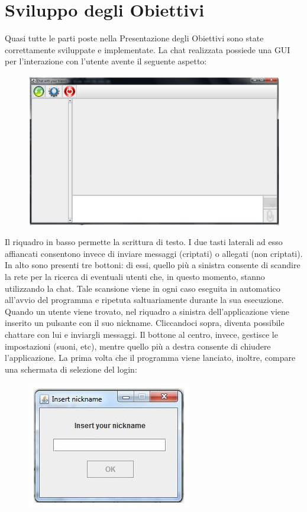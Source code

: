 \section{Sviluppo degli Obiettivi}
Quasi tutte le parti poste nella Presentazione degli Obiettivi sono state correttamente
sviluppate e implementate. La chat realizzata possiede una GUI per l'interazione
con l'utente avente il seguente aspetto:
\newpage
\begin{figure}[h]
\centering
\includegraphics[scale=0.4]{gui1.jpg}
\end{figure}

Il riquadro in basso permette la scrittura di testo.
I due tasti laterali ad esso affiancati
consentono invece di inviare messaggi (criptati) o allegati (non criptati).
In alto sono presenti tre bottoni:
di essi, quello più a sinistra consente di scandire la rete per la ricerca di eventuali 
utenti che, in questo momento, stanno utilizzando la chat.
Tale scansione viene in ogni caso eseguita in automatico all'avvio del programma
e ripetuta saltuariamente durante la sua esecuzione.
Quando un utente viene trovato, nel riquadro a sinistra 
dell'applicazione viene inserito un pulsante con il suo nickname.
Cliccandoci sopra, diventa possibile chattare con lui e inviargli messaggi.
Il bottone al centro, invece, gestisce le impostazioni (suoni, etc),
mentre quello più a destra consente di chiudere l'applicazione.
La prima volta che il programma viene lanciato, inoltre,
compare una schermata di selezione del login:
\begin{figure}[h]
\centering
\includegraphics[scale=0.5]{login1.jpg}
\end{figure}

